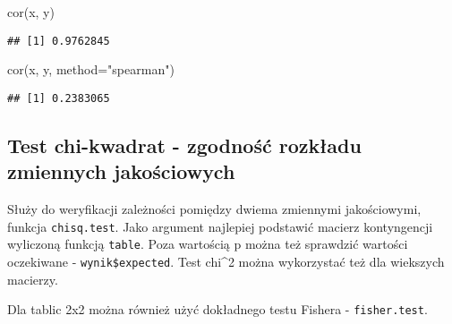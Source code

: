 \documentclass[
]{book}
\newenvironment{Shaded}{\begin{snugshade}}{\end{snugshade}}
\newcommand{\AttributeTok}[1]{\textcolor[rgb]{0.77,0.63,0.00}{#1}}
\newcommand{\FunctionTok}[1]{\textcolor[rgb]{0.00,0.00,0.00}{#1}}
\newcommand{\NormalTok}[1]{#1}
\newcommand{\StringTok}[1]{\textcolor[rgb]{0.31,0.60,0.02}{#1}}
\begin{document}
\begin{Shaded}
\begin{Highlighting}[]
\FunctionTok{cor}\NormalTok{(x, y)}
\end{Highlighting}
\end{Shaded}

\begin{verbatim}
## [1] 0.9762845
\end{verbatim}

\begin{Shaded}
\begin{Highlighting}[]
\FunctionTok{cor}\NormalTok{(x, y, }\AttributeTok{method=}\StringTok{"spearman"}\NormalTok{)}
\end{Highlighting}
\end{Shaded}

\begin{verbatim}
## [1] 0.2383065
\end{verbatim}

\hypertarget{test-chi-kwadrat---zgodnoux15bux107-rozkux142adu-zmiennych-jakoux15bciowych}{%
\subsection{Test chi-kwadrat - zgodność rozkładu zmiennych jakościowych}\label{test-chi-kwadrat---zgodnoux15bux107-rozkux142adu-zmiennych-jakoux15bciowych}}

Służy do weryfikacji zależności pomiędzy dwiema zmiennymi jakościowymi, funkcja \texttt{chisq.test}. Jako argument najlepiej podstawić macierz kontyngencji wyliczoną funkcją \texttt{table}. Poza wartością p można też sprawdzić wartości oczekiwane - \texttt{wynik\$expected}. Test chi\^{}2 można wykorzystać też dla wiekszych macierzy.

Dla tablic 2x2 można również użyć dokładnego testu Fishera - \texttt{fisher.test}.
\end{document}
